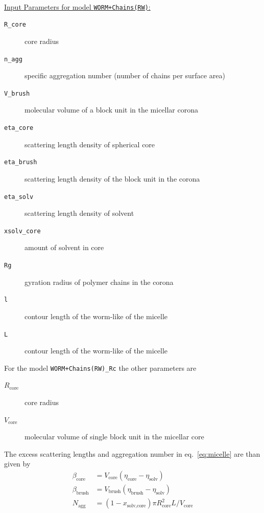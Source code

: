\hspace{1pt}\\
\uline{Input Parameters for model \texttt{WORM+Chains(RW)}:}
\begin{description}
\item[\texttt{R\_core}] core radius
\item[\texttt{n\_agg}] specific aggregation number (number of chains per surface area)
\item[\texttt{V\_brush}]  molecular volume of a block unit in the micellar corona
\item[\texttt{eta\_core}] scattering length density of spherical core
\item[\texttt{eta\_brush}] scattering length density of the block unit in the corona
\item[\texttt{eta\_solv}] scattering length density of solvent
\item[\texttt{xsolv\_core}] amount of solvent in core
\item[\texttt{Rg}] gyration radius of polymer chains in the corona
\item[\texttt{l}] contour length of the worm-like of the micelle
\item[\texttt{L}] contour length of the worm-like of the micelle
\end{description}

\vspace{10mm}

\noindent
For the model \texttt{WORM+Chains(RW)\_Rc} the other parameters are
\begin{description}
\item[$R_\text{core}$] core radius
\item[$V_\text{core}$] molecular volume of single block unit in the micellar core
\end{description}
The excess scattering lengths and aggregation number in eq.\
\ref{eq:micelle} are than given by
\begin{align}
\beta_\text{core}  &= V_\text{core}  (\eta_\text{core} -\eta_\text{solv}) \\
\beta_\text{brush} &= V_\text{brush} (\eta_\text{brush}-\eta_\text{solv}) \\
N_\text{agg} &= (1-x_\text{solv,core}) \pi  R_\text{core}^2 L  / V_\text{core}
\end{align}

